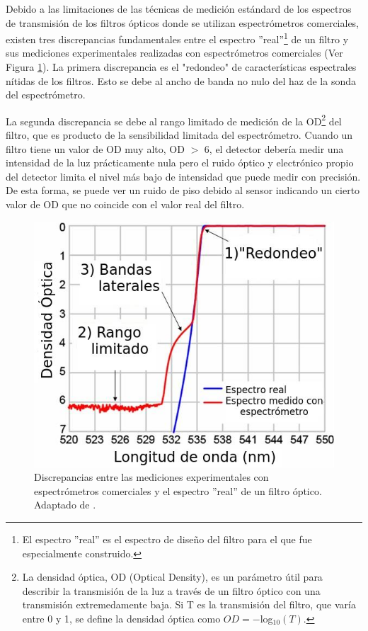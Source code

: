 \documentclass{ctuthesis}
\begin{document}
Debido a las limitaciones de las técnicas de 
medición estándard 
de los espectros de transmisión de los filtros ópticos donde se utilizan 
espectrómetros comerciales, existen tres discrepancias fundamentales 
entre el espectro ''real''\footnote{El espectro ''real'' es 
	el espectro de diseño del filtro para el que fue especialmente construido.} 
	de 
un 
filtro y sus mediciones experimentales realizadas con 
espectrómetros comerciales (Ver Figura \ref{fig:obj1a})\cite{Semrock}. La 
primera discrepancia es el "redondeo" de características espectrales nítidas de 
los filtros. 
Esto se debe al ancho de banda no nulo del haz de la sonda del 
espectrómetro. 


La segunda discrepancia se debe al rango limitado de 
medición de la OD\footnote{La densidad óptica, OD (Optical Density), es un 
	parámetro útil para describir la transmisión de la luz a través de un 
	filtro 
	óptico con una transmisión extremedamente baja. Si T es la transmisión del 
	filtro, que varía entre 0 y 1, se define la densidad óptica como $OD = 
	-$log$_{10} (T)$.} del filtro, que es 
producto de la sensibilidad limitada del espectrómetro. Cuando un filtro 
tiene un valor de OD muy alto, OD $>$ 6, el detector debería medir una 
intensidad de la luz prácticamente nula pero el ruido óptico y electrónico 
propio del detector limita el nivel más bajo de intensidad que puede medir 
con precisión. De esta forma, se puede ver un ruido de piso debido al 
sensor indicando un cierto valor de OD que no coincide con el valor real 
del filtro.

\begin{figure}[H]
	\centering
	\includegraphics[scale=0.8]{Figs/plan_de_tesis/measurement_of_optical_filter.jpg}
	\caption{Discrepancias entre las mediciones experimentales con 
		espectrómetros 
		comerciales y el espectro ''real'' de un filtro óptico. Adaptado de 
		\cite{Semrock}.}
	\label{fig:obj1a}
\end{figure}
\end{document}
